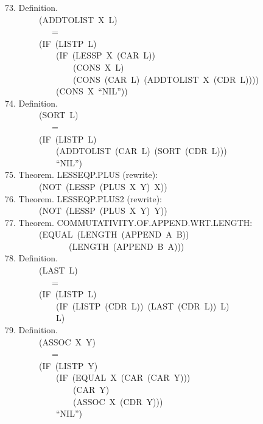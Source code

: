 \documentclass[10pt]{book}
\newenvironment{pubasis}{\begin{flushleft}}{\end{flushleft}}
\begin{document}
\begin{pubasis}
73.     Definition.\\
~~~~~~~~(ADDTOLIST~X~L)\\
~~~~~~~~~~~=\\
~~~~~~~~(IF~(LISTP~L)\\
~~~~~~~~~~~~(IF~(LESSP~X~(CAR~L))\\
~~~~~~~~~~~~~~~~(CONS~X~L)\\
~~~~~~~~~~~~~~~~(CONS~(CAR~L)~(ADDTOLIST~X~(CDR~L))))\\
~~~~~~~~~~~~(CONS~X~``NIL''))\\

74.     Definition.\\
~~~~~~~~(SORT~L)\\
~~~~~~~~~~~=\\
~~~~~~~~(IF~(LISTP~L)\\
~~~~~~~~~~~~(ADDTOLIST~(CAR~L)~(SORT~(CDR~L)))\\
~~~~~~~~~~~~``NIL'')\\

75.     Theorem.  LESSEQP.PLUS (rewrite):\\
~~~~~~~~(NOT~(LESSP~(PLUS~X~Y)~X))\\

76.     Theorem.  LESSEQP.PLUS2 (rewrite):\\
~~~~~~~~(NOT~(LESSP~(PLUS~X~Y)~Y))\\

77.     Theorem.  COMMUTATIVITY.OF.APPEND.WRT.LENGTH:\\
~~~~~~~~(EQUAL~(LENGTH~(APPEND~A~B))\\
~~~~~~~~~~~~~~~(LENGTH~(APPEND~B~A)))\\

78.     Definition.\\
~~~~~~~~(LAST~L)\\
~~~~~~~~~~~=\\
~~~~~~~~(IF~(LISTP~L)\\
~~~~~~~~~~~~(IF~(LISTP~(CDR~L))~(LAST~(CDR~L))~L)\\
~~~~~~~~~~~~L)\\

79.     Definition.\\
~~~~~~~~(ASSOC~X~Y)\\
~~~~~~~~~~~=\\
~~~~~~~~(IF~(LISTP~Y)\\
~~~~~~~~~~~~(IF~(EQUAL~X~(CAR~(CAR~Y)))\\
~~~~~~~~~~~~~~~~(CAR~Y)\\
~~~~~~~~~~~~~~~~(ASSOC~X~(CDR~Y)))\\
~~~~~~~~~~~~``NIL'')\\


\end{pubasis}
\end{document}
